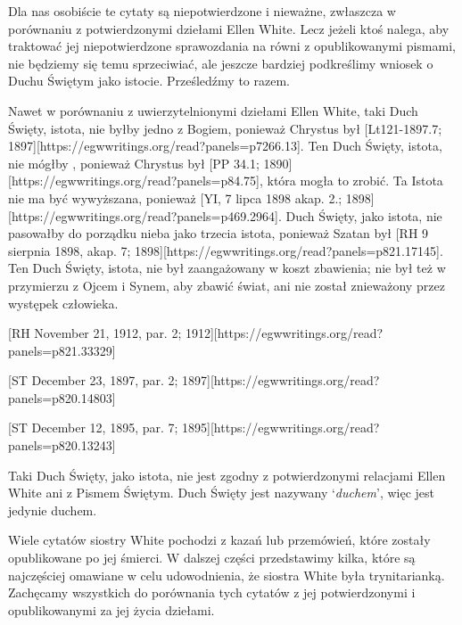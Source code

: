 Dla nas osobiście te cytaty są niepotwierdzone i nieważne, zwłaszcza w porównaniu z potwierdzonymi dziełami Ellen White. Lecz jeżeli ktoś nalega, aby traktować jej niepotwierdzone sprawozdania na równi z opublikowanymi pismami, nie będziemy się temu sprzeciwiać, ale jeszcze bardziej podkreślimy wniosek o Duchu Świętym jako istocie. Prześledźmy to razem.

Nawet w porównaniu z uwierzytelnionymi dziełami Ellen White, taki Duch Święty, istota, nie byłby jedno z Bogiem, ponieważ Chrystus był [Lt121-1897.7; 1897][https://egwwritings.org/read?panels=p7266.13]. Ten Duch Święty, istota, nie mógłby , ponieważ Chrystus był [PP 34.1; 1890][https://egwwritings.org/read?panels=p84.75], która mogła to zrobić. Ta Istota nie ma być wywyższana, ponieważ [YI, 7 lipca 1898 akap. 2.; 1898][https://egwwritings.org/read?panels=p469.2964]. Duch Święty, jako istota, nie pasowałby do porządku nieba jako trzecia istota, ponieważ Szatan był [RH 9 sierpnia 1898, akap. 7; 1898][https://egwwritings.org/read?panels=p821.17145]. Ten Duch Święty, istota, nie był zaangażowany w koszt zbawienia; nie był też w przymierzu z Ojcem i Synem, aby zbawić świat, ani nie został znieważony przez występek człowieka.

[RH November 21, 1912, par. 2; 1912][https://egwwritings.org/read?panels=p821.33329]

[ST December 23, 1897, par. 2; 1897][https://egwwritings.org/read?panels=p820.14803]

[ST December 12, 1895, par. 7; 1895][https://egwwritings.org/read?panels=p820.13243]

Taki Duch Święty, jako istota, nie jest zgodny z potwierdzonymi relacjami Ellen White ani z Pismem Świętym. Duch Święty jest nazywany ‘\textit{duchem}’, więc jest jedynie duchem.

Wiele cytatów siostry White pochodzi z kazań lub przemówień, które zostały opublikowane po jej śmierci. W dalszej części przedstawimy kilka, które są najczęściej omawiane w celu udowodnienia, że siostra White była trynitarianką. Zachęcamy wszystkich do porównania tych cytatów z jej potwierdzonymi i opublikowanymi za jej życia dziełami.

